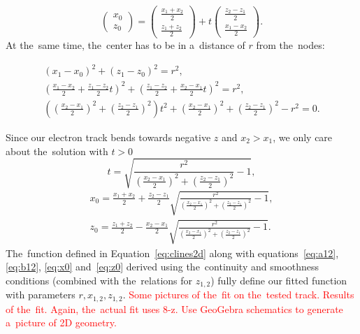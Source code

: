 				\begin{equation}
					\begin{pmatrix} x_0\\ z_0 \end{pmatrix} = \begin{pmatrix} \frac{x_1+x_2}{2}\\ \frac{z_1+z_2}{2} \end{pmatrix} + t \begin{pmatrix} \frac{z_2-z_1}{2}\\ \frac{x_1-x_2}{2} \end{pmatrix}.
				\end{equation}
			At the~same time, the~center has to be in a~distance of $r$ from the~nodes:
				\begin{linenomath}
				\begin{gather}
					(x_1-x_0)^2 + (z_1-z_0)^2 = r^2,\\
					\left(\frac{x_1-x_2}{2}+\frac{z_1-z_2}{2}t\right)^2 + \left(\frac{z_1-z_2}{2}+\frac{x_2-x_1}{2}t\right)^2 = r^2,\\
					\left(\left(\frac{x_2-x_1}{2}\right)^2+\left(\frac{z_2-z_1}{2}\right)^2\right)t^2+\left(\frac{x_2-x_1}{2}\right)^2+\left(\frac{z_2-z_1}{2}\right)^2-r^2=0.
				\end{gather}
				\end{linenomath}
			Since our electron track bends towards negative $z$ and $x_2 > x_1$, we only care about the~solution with $t>0$
				\begin{equation}
					t = \sqrt{\frac{r^2}{\left(\frac{x_2-x_1}{2}\right)^2+\left(\frac{z_2-z_1}{2}\right)^2}-1},
				\end{equation}
				\begin{align}
					x_0 = \frac{x_1+x_2}{2} + \frac{z_2-z_1}{2} \sqrt{\frac{r^2}{\left(\frac{x_2-x_1}{2}\right)^2+\left(\frac{z_2-z_1}{2}\right)^2}-1},\label{eq:x0}\\
					z_0 = \frac{z_1+z_2}{2} - \frac{x_2-x_1}{2} \sqrt{\frac{r^2}{\left(\frac{x_2-x_1}{2}\right)^2+\left(\frac{z_2-z_1}{2}\right)^2}-1}.\label{eq:z0}
				\end{align}
			The~function defined in Equation~\ref{eq:clines2d} along with equations~\ref{eq:a12}, \ref{eq:b12}, \ref{eq:x0} and~\ref{eq:z0} derived using the~continuity and smoothness conditions (combined with the~relations for $z_{1,2}$) fully define our fitted function with parameters $r,x_{1,2},z_{1,2}$. \textcolor{red}{Some pictures of the~fit on the~tested track. Results of the~fit. Again, the~actual fit uses 8-z. Use GeoGebra schematics to generate a~picture of 2D geometry.}
			
